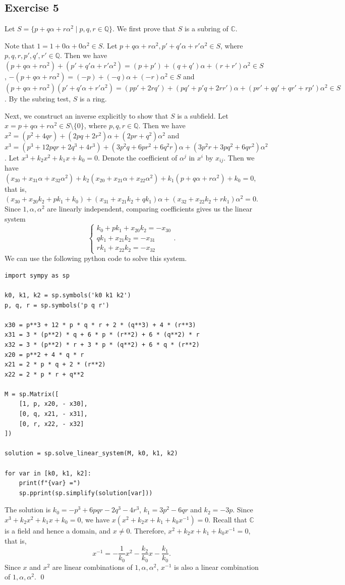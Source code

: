 \documentclass[a4paper, 12pt]{article}
\newcommand{\C}{\mathbb{C}}
\newcommand{\Q}{\mathbb{Q}}
\newcommand{\epf}{\hfill \qed}
\newcommand{\ex}[1]{
\subsection*{#1}
\addcontentsline{toc}{subsection}{#1}
}
\begin{document}
\ex{Exercise 5}

Let $S = \{p+q\alpha+r\alpha^2 \mid p,q,r\in\Q\}$. We first prove that $S$ is a subring of $\C$. 

Note that $1=1+0\alpha+0\alpha^2\in S$. Let $p+q\alpha+r\alpha^2,p'+q'\alpha+r'\alpha^2 \in S$, where $p,q,r,p',q',r' \in \Q$. Then we have $(p+q\alpha+r\alpha^2)+(p'+q'\alpha+r'\alpha^2) = (p+p') + (q+q')\alpha + (r+r')\alpha^2 \in S$, $-(p+q\alpha+r\alpha^2) = (-p) + (-q)\alpha + (-r)\alpha^2 \in S$ and $(p+q\alpha+r\alpha^2)(p'+q'\alpha+r'\alpha^2) = (pp'+2rq') + (pq'+p'q+2rr')\alpha + (pr'+qq'+qr'+rp')\alpha^2 \in S$. By the subring test, $S$ is a ring.

Next, we construct an inverse explicitly to show that $S$ is a subfield. Let $x = p+q\alpha+r\alpha^2 \in S \setminus \{0\}$, where $p,q,r \in \Q$. Then we have $x^2=(p^2+4qr)+(2pq+2r^2)\alpha+(2pr+q^2)\alpha^2$ and $x^3=(p^3+12pqr+2q^3+4r^3)+(3p^2q+6pr^2+6q^2r)\alpha+(3p^2r+3pq^2+6qr^2)\alpha^2$. Let $x^3+k_2x^2+k_1x+k_0=0$. Denote the coefficient of $\alpha^j$ in $x^i$ by $x_{ij}$. Then we have $(x_{30}+x_{31}\alpha+x_{32}\alpha^2)+k_2(x_{20}+x_{21}\alpha+x_{22}\alpha^2)+k_1(p+q\alpha+r\alpha^2)+k_0=0$, that is, $(x_{30}+x_{20}k_2+pk_1+k_0) + (x_{31}+x_{21}k_2+qk_1)\alpha + (x_{32}+x_{22}k_2+rk_1)\alpha^2 = 0$. Since $1,\alpha,\alpha^2$ are linearly independent, comparing coefficients gives us the linear system
\[ \begin{cases}
    k_0 + pk_1 + x_{20}k_2 = -x_{30} \\
    qk_1 + x_{21}k_2 = -x_{31} \\
    rk_1 + x_{22}k_2 = -x_{32}
\end{cases}. \]
We can use the following python code to solve this system.

\begin{verbatim}
import sympy as sp

k0, k1, k2 = sp.symbols('k0 k1 k2')
p, q, r = sp.symbols('p q r')

x30 = p**3 + 12 * p * q * r + 2 * (q**3) + 4 * (r**3)
x31 = 3 * (p**2) * q + 6 * p * (r**2) + 6 * (q**2) * r
x32 = 3 * (p**2) * r + 3 * p * (q**2) + 6 * q * (r**2)
x20 = p**2 + 4 * q * r
x21 = 2 * p * q + 2 * (r**2)
x22 = 2 * p * r + q**2

M = sp.Matrix([
    [1, p, x20, - x30],
    [0, q, x21, - x31],
    [0, r, x22, - x32]
])

solution = sp.solve_linear_system(M, k0, k1, k2)

for var in [k0, k1, k2]:
    print(f"{var} =")
    sp.pprint(sp.simplify(solution[var]))
\end{verbatim}

The solution is $k_0 = -p^3+6pqr-2q^3-4r^3$, $k_1=3p^2-6qr$ and $k_2=-3p$. Since $x^3+k_2x^2+k_1x+k_0 = 0$, we have $x(x^2+k_2x+k_1+k_0x^{-1}) = 0$. Recall that $\C$ is a field and hence a domain, and $x \neq 0$. Therefore, $x^2+k_2x+k_1+k_0x^{-1} = 0$, that is,
\[x^{-1} = -\frac{1}{k_0}x^2 -\frac{k_2}{k_0}x -\frac{k_1}{k_0}.\]
Since $x$ and $x^2$ are linear combinations of $1,\alpha,\alpha^2$, $x^{-1}$ is also a linear combination of $1,\alpha,\alpha^2$. \epf
\end{document}
